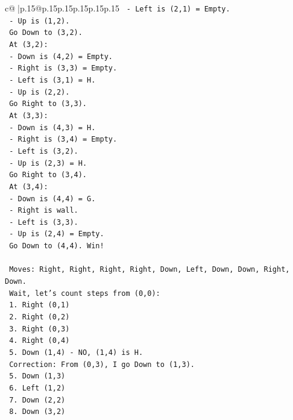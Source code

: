 \documentclass{article}
\begin{document}
{\begin{supertabular}{c@{$\;$}|p{.15\linewidth}@{}p{.15\linewidth}p{.15\linewidth}p{.15\linewidth}p{.15\linewidth}p{.15\linewidth}}
{{{\texttt{     {-} Left is (2,1) = Empty.} \\
\texttt{     {-} Up is (1,2).} \\
\texttt{   Go Down to (3,2).} \\
\texttt{   At (3,2):} \\
\texttt{     {-} Down is (4,2) = Empty.} \\
\texttt{     {-} Right is (3,3) = Empty.} \\
\texttt{     {-} Left is (3,1) = H.} \\
\texttt{     {-} Up is (2,2).} \\
\texttt{   Go Right to (3,3).} \\
\texttt{   At (3,3):} \\
\texttt{     {-} Down is (4,3) = H.} \\
\texttt{     {-} Right is (3,4) = Empty.} \\
\texttt{     {-} Left is (3,2).} \\
\texttt{     {-} Up is (2,3) = H.} \\
\texttt{   Go Right to (3,4).} \\
\texttt{   At (3,4):} \\
\texttt{     {-} Down is (4,4) = G.} \\
\texttt{     {-} Right is wall.} \\
\texttt{     {-} Left is (3,3).} \\
\texttt{     {-} Up is (2,4) = Empty.} \\
\texttt{   Go Down to (4,4). Win!} \\
\\ 
\texttt{   Moves: Right, Right, Right, Right, Down, Left, Down, Down, Right, Down.} \\
\texttt{   Wait, let's count steps from (0,0):} \\
\texttt{   1. Right (0,1)} \\
\texttt{   2. Right (0,2)} \\
\texttt{   3. Right (0,3)} \\
\texttt{   4. Right (0,4)} \\
\texttt{   5. Down (1,4) {-} NO, (1,4) is H.} \\
\texttt{   Correction: From (0,3), I go Down to (1,3).} \\
\texttt{   5. Down (1,3)} \\
\texttt{   6. Left (1,2)} \\
\texttt{   7. Down (2,2)} \\
\texttt{   8. Down (3,2)} \\
}}}
\end{supertabular}}
\end{document}
